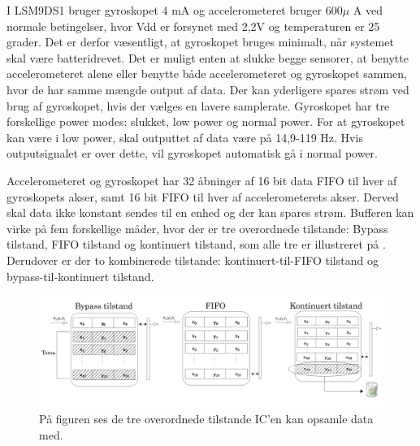 I LSM9DS1 bruger gyroskopet 4 mA og accelerometeret bruger 600$\mu$ A ved normale betingelser, hvor Vdd er forsynet med 2,2V og temperaturen er 25 grader. Det er derfor væsentligt, at gyroskopet bruges minimalt, når systemet skal være batteridrevet. Det er muligt enten at slukke begge sensorer, at benytte accelerometeret alene eller benytte både accelerometeret og gyroskopet sammen, hvor de har samme mængde output af data. Der kan yderligere spares strøm ved brug af gyroskopet, hvis der vælges en lavere samplerate. %
Gyroskopet har tre forskellige power modes: slukket, low power og normal power. For at gyroskopet kan være i low power, skal outputtet af data være på 14,9-119 Hz. Hvis outputsignalet er over dette, vil gyroskopet automatisk gå i normal power. 

Accelerometeret og gyroskopet har 32 åbninger af 16 bit data FIFO til hver af gyroskopets akser, samt 16 bit FIFO til hver af accelerometerets akser. Derved skal data ikke konstant sendes til en enhed og der kan spares strøm. Bufferen kan virke på fem forskellige måder, hvor der er tre overordnede tilstande: Bypass tilstand, FIFO tilstand og kontinuert tilstand, som alle tre er illustreret på . Derudover er der to kombinerede tilstande: kontinuert-til-FIFO tilstand og bypass-til-kontinuert tilstand. \newline

\begin{figure}[H]
	\centering
	\includegraphics[scale=0.28]{figures/cDesign/LSM9DS1_tilstand.png}
	\caption{På figuren ses de tre overordnede tilstande IC'en kan opsamle data med.\citep{Jimb02016}}
	\label{tilstand}
\end{figure}

